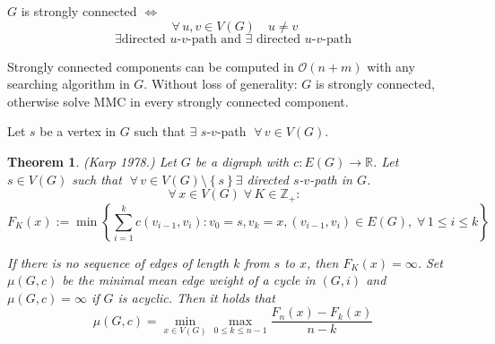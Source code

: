 \documentclass{article}
\newtheorem{theorem}{Theorem}
\newcommand{\set}[1]{\left\{#1\right\}}
\newcommand{\gath}[2]{$#1$-$#2$-path} %
\newcommand{\fall}{\;\forall\,}
\begin{document}
 $G$ is strongly connected $\Leftrightarrow$
\[
  \fall u, v \in V(G) \quad u \neq v
\] \[
  \exists \text{directed \gath uv and } \exists \text{ directed \gath uv}
\]

Strongly connected components can be computed in $\mathcal{O}(n + m)$ with any searching algorithm in $G$. Without loss of generality: $G$ is strongly connected, otherwise solve MMC in every strongly connected component.

Let $s$ be a vertex in $G$ such that $\exists$ \gath sv $\fall v \in V(G)$.

\begin{theorem}\label{satz-3.10}
  (Karp 1978.)
  Let $G$ be a digraph with $c: E(G) \rightarrow \mathbb{R}$. Let $s \in V(G)$ such that $\fall v \in V(G) \setminus \set{s} \exists$ directed \gath sv in $G$.
  \[
    \fall x \in V(G) \fall K \in \mathbb{Z}_+:
  \] \[
    F_K(x) := \min\set{
      \sum_{i=1}^k c(v_{i-1}, v_i):
        v_0 = s, v_k = x, (v_{i-1}, v_i) \in E(G),
        \fall 1 \leq i \leq k
    }
  \]

  If there is no sequence of edges of length $k$ from $s$ to $x$, then $F_K(x) = \infty$.
  Set $\mu(G, c)$ be the minimal mean edge weight of a cycle in $(G, i)$ and $\mu(G, c) = \infty$ if $G$ is acyclic. Then it holds that
  \[
    \mu(G, c) = \min_{x \in V(G)} \max_{0 \leq k \leq n-1} \frac{F_n(x) - F_k(x)}{n-k}
  \]
\end{theorem}
\end{document}
